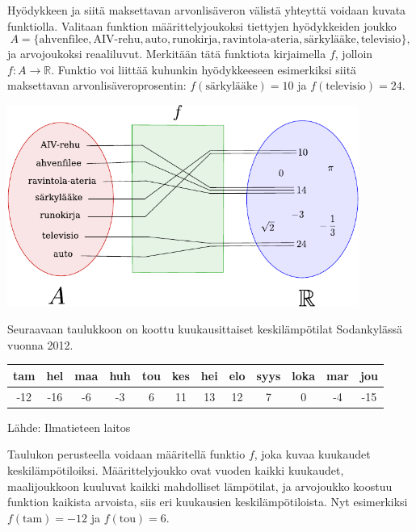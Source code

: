 \begin{esimerkki}
	Hyödykkeen ja siitä maksettavan arvonlisäveron välistä yhteyttä voidaan kuvata funktiolla.
	Valitaan funktion määrittelyjoukoksi tiettyjen hyödykkeiden joukko
		\[ A = \{\text{ahvenfilee}, \text{AIV-rehu}, \text{auto}, \text{runokirja},
		\text{ravintola-ateria}, \text{särkylääke}, \text{televisio}\}, \]
	ja arvojoukoksi reaaliluvut. Merkitään tätä funktiota kirjaimella $f$, jolloin
	$f\colon A \to \mathbb{R}$.
	Funktio voi liittää kuhunkin hyödykkeeseen esimerkiksi siitä maksettavan arvonlisäveroprosentin:
	$f(\text{särkylääke}) = 10$ ja $f(\text{televisio}) = 24$.

	\begin{center}
		\includegraphics[width=11.5cm]{pictures/funktiokone.pdf}
	\end{center}
\end{esimerkki}



\begin{esimerkki}
Seuraavaan taulukkoon on koottu kuukausittaiset keskilämpötilat Sodankylässä vuonna 2012.

	\begin{tabular}{|c|c|c|c|c|c|c|c|c|c|c|c|}
	\hline
	tam & hel & maa & huh & tou & kes & hei & elo & syys & loka & mar & jou\\
	\hline
	-12 & -16 & -6 & -3 & 6 & 11 & 13 & 12 & 7 & 0 & -4 & -15\\
	\hline %
	\end{tabular}
	
Lähde: Ilmatieteen laitos %

Taulukon perusteella voidaan määritellä funktio $f$, joka kuvaa kuukaudet keskilämpötiloiksi. Määrittelyjoukko ovat vuoden kaikki kuukaudet, maalijoukkoon kuuluvat kaikki mahdolliset lämpötilat, ja arvojoukko koostuu funktion kaikista arvoista, siis eri kuukausien keskilämpötiloista. %
Nyt esimerkiksi $f(\text{tam}) = -12$ ja $f(\text{tou}) = 6$.

\end{esimerkki}

